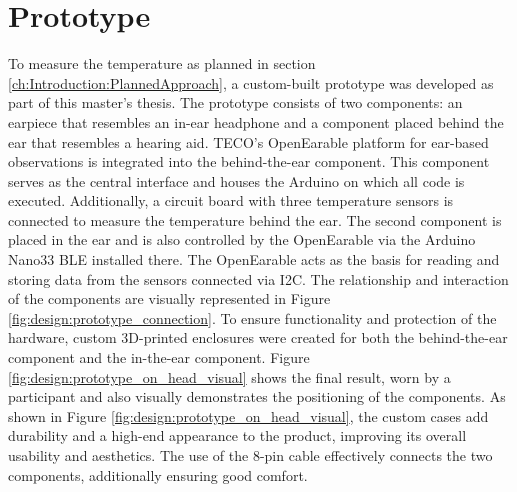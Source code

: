 \section{Prototype}
\label{ch:Design:Prototype}
To measure the temperature as planned in section \ref{ch:Introduction:PlannedApproach}, a custom-built prototype was developed as part of this master's thesis.
The prototype consists of two components: an earpiece that resembles an in-ear headphone and a component placed behind the ear that resembles a hearing aid. TECO's OpenEarable platform for ear-based observations is integrated into the behind-the-ear component. This component serves as the central interface and houses the Arduino on which all code is executed. Additionally, a circuit board with three temperature sensors is connected to measure the temperature behind the ear.
The second component is placed in the ear and is also controlled by the OpenEarable via the Arduino Nano33 BLE installed there. The OpenEarable acts as the basis for reading and storing data from the sensors connected via I2C. The relationship and interaction of the components are visually represented in Figure \ref{fig:design:prototype_connection}.
To ensure functionality and protection of the hardware, custom 3D-printed enclosures were created for both the behind-the-ear component and the in-the-ear component. 
Figure \ref{fig:design:prototype_on_head_visual} shows the final result, worn by a participant and also visually demonstrates the positioning of the components.
As shown in Figure \ref{fig:design:prototype_on_head_visual}, the custom cases add durability and a high-end appearance to the product, improving its overall usability and aesthetics.
The use of the 8-pin cable effectively connects the two components, additionally ensuring good comfort.

